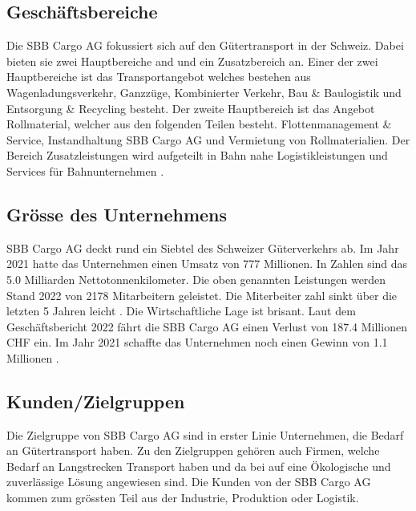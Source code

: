 \documentclass{article}
\begin{document}
\subsection{Geschäftsbereiche}

Die SBB Cargo AG fokussiert sich auf den Gütertransport in der Schweiz.
Dabei bieten sie zwei Hauptbereiche and und ein Zusatzbereich an.
Einer der zwei Hauptbereiche ist das Transportangebot welches bestehen aus Wagenladungsverkehr, Ganzzüge, Kombinierter Verkehr, Bau \& Baulogistik und Entsorgung \& Recycling besteht.
Der zweite Hauptbereich ist das Angebot Rollmaterial, welcher aus den folgenden Teilen besteht. Flottenmanagement \& Service, Instandhaltung SBB Cargo AG und Vermietung von Rollmaterialien. 
Der Bereich Zusatzleistungen wird aufgeteilt in Bahn nahe Logistikleistungen und Services für Bahnunternehmen \parencite[o. S.]{angebot}.

\subsection{Grösse des Unternehmens }

SBB Cargo AG deckt rund ein Siebtel des Schweizer Güterverkehrs ab.
Im Jahr 2021 hatte das Unternehmen einen Umsatz von 777 Millionen.
In Zahlen sind das 5.0 Milliarden Nettotonnenkilometer.
Die oben genannten Leistungen werden Stand 2022 von 2178 Mitarbeitern geleistet.
Die Miterbeiter zahl sinkt über die letzten 5 Jahren leicht \parencite[o. S.]{personal}.
Die Wirtschaftliche Lage ist brisant.
Laut dem Geschäftsbericht 2022 fährt die SBB Cargo AG einen Verlust von 187.4 Millionen CHF ein.
Im Jahr 2021 schaffte das Unternehmen noch einen Gewinn von 1.1 Millionen \parencite[S. 46]{geschaeftsbericht2022}.

\subsection{Kunden/Zielgruppen}

Die Zielgruppe von SBB Cargo AG sind in erster Linie Unternehmen, die Bedarf an Gütertransport haben.
Zu den Zielgruppen gehören auch Firmen, welche Bedarf an Langstrecken Transport haben und da bei auf eine Ökologische und zuverlässige Lösung angewiesen sind.
Die Kunden von der SBB Cargo AG kommen zum grössten Teil aus der Industrie, Produktion oder Logistik.
\end{document}
